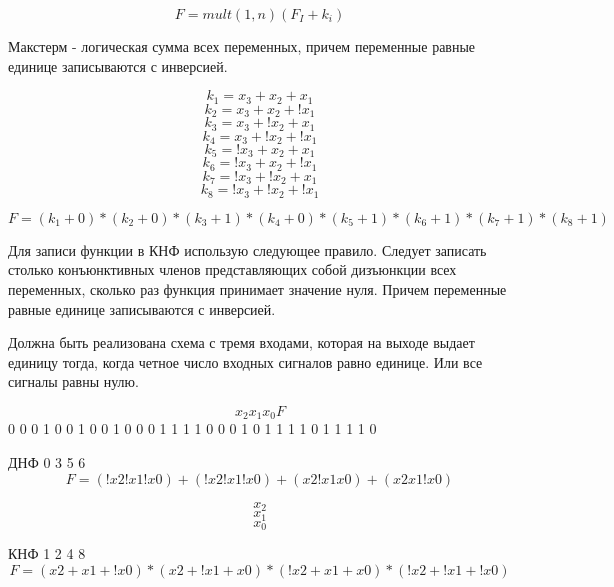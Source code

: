 \documentclass[a4paper]{article}
\begin{document}
$$ F = mult(1, n)(F_I + k_i) $$


Макстерм - логическая сумма всех переменных, причем переменные равные единице записываются с инверсией. 


$$ k_1 = x_3 + x_2 + x_1 $$
$$ k_2 = x_3 + x_2 + !x_1 $$
$$ k_3 = x_3 + !x_2 + x_1 $$
$$ k_4 = x_3 + !x_2 + !x_1 $$
$$ k_5 = !x_3 + x_2 + x_1 $$
$$ k_6 = !x_3 + x_2 + !x_1 $$
$$ k_7 = !x_3 + !x_2 + x_1 $$
$$ k_8 = !x_3 + !x_2 + !x_1 $$


$$ F = (k_1 + 0) * (k_2 + 0) * (k_3 + 1) * (k_4 + 0) * (k_5 + 1) * (k_6 + 1) * (k_7 + 1) * (k_8 + 1)$$


Для записи функции в КНФ использую следующее правило. Следует записать столько конъюнктивных членов
представляющих собой дизъюнкции всех переменных, сколько раз функция принимает значение нуля. Причем переменные равные единице записываются с инверсией.


Должна быть реализована схема с тремя входами, которая на выходе выдает единицу тогда, когда четное число входных сигналов равно единице.
Или все сигналы равны нулю.


$$ x_2 x_1 x_0 F $$
0 0 0 1 
0 0 1 0
0 1 0 0
0 1 1 1
1 0 0 0
1 0 1 1
1 1 0 1
1 1 1 0 


ДНФ
0 3 5 6
$$ F = (!x2!x1!x0) + (!x2!x1!x0) + (x2!x1x0) + (x2x1!x0)$$

$$ x_2 $$
$$ x_1 $$
$$ x_0 $$



КНФ
1 2 4 8
$$ F = (x2+x1+!x0)*(x2+!x1+x0)*(!x2+x1+x0)*(!x2+!x1+!x0)$$
\end{document}
